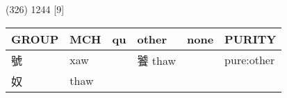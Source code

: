 \documentclass[14pt,a4paper]{scrartcl}
\begin{document}
(326) 1244 {[}9{]}

\begin{longtable}[c]{@{}llllll@{}}
\toprule
\begin{minipage}[b]{0.14\columnwidth}\raggedright\strut
GROUP
\strut\end{minipage} &
\begin{minipage}[b]{0.14\columnwidth}\raggedright\strut
MCH
\strut\end{minipage} &
\begin{minipage}[b]{0.14\columnwidth}\raggedright\strut
qu
\strut\end{minipage} &
\begin{minipage}[b]{0.14\columnwidth}\raggedright\strut
other
\strut\end{minipage} &
\begin{minipage}[b]{0.14\columnwidth}\raggedright\strut
none
\strut\end{minipage} &
\begin{minipage}[b]{0.14\columnwidth}\raggedright\strut
PURITY
\strut\end{minipage}\tabularnewline
\midrule
\endhead
\begin{minipage}[t]{0.14\columnwidth}\raggedright\strut
號
\strut\end{minipage} &
\begin{minipage}[t]{0.14\columnwidth}\raggedright\strut
xaw
\strut\end{minipage} &
\begin{minipage}[t]{0.14\columnwidth}\raggedright\strut
\strut\end{minipage} &
\begin{minipage}[t]{0.14\columnwidth}\raggedright\strut
饕 thaw
\strut\end{minipage} &
\begin{minipage}[t]{0.14\columnwidth}\raggedright\strut
\strut\end{minipage} &
\begin{minipage}[t]{0.14\columnwidth}\raggedright\strut
pure:other
\strut\end{minipage}\tabularnewline
\begin{minipage}[t]{0.14\columnwidth}\raggedright\strut
奴
\strut\end{minipage} &
\begin{minipage}[t]{0.14\columnwidth}\raggedright\strut
thaw
\strut\end{minipage} &
\begin{minipage}[t]{0.14\columnwidth}\raggedright\strut
\strut\end{minipage} &

\end{longtable}
\end{document}

